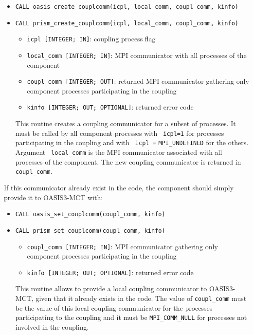 \begin{itemize}
\item {\tt CALL oasis\_create\_couplcomm(icpl, local\_comm,
    coupl\_comm, kinfo)}
\item {\tt CALL prism\_create\_couplcomm(icpl, local\_comm,
    coupl\_comm, kinfo)}
  \begin{itemize}
  \item {\tt icpl [INTEGER; IN]}: coupling process flag
  \item {\tt local\_comm [INTEGER; IN]}: MPI communicator with all
    processes of the component
  \item {\tt coupl\_comm [INTEGER; OUT]}: returned MPI communicator
    gathering only component processes participating in the coupling
  \item {\tt kinfo [INTEGER; OUT; OPTIONAL]}: returned error code
  \end{itemize}

  This routine creates a coupling communicator for a subset of
  processes. It must be called by all component processes with {\tt
    icpl=1} for processes participating in the coupling and with {\tt
    icpl =} {\tt MPI\_UNDEFINED} for the others. Argument {\tt
    local\_comm} is the MPI communicator associated with all processes
  of the component. The new coupling communicator is returned in {\tt
    coupl\_comm}.
\end{itemize}

If this communicator already exist in the code, the component should
simply provide it to OASIS3-MCT with:

\begin{itemize}
\item {\tt CALL oasis\_set\_couplcomm(coupl\_comm, kinfo)}
\item {\tt CALL prism\_set\_couplcomm(coupl\_comm, kinfo)}
  \begin{itemize}
  \item {\tt coupl\_comm [INTEGER; IN]}: MPI communicator gathering
    only component processes participating in the coupling
  \item {\tt kinfo [INTEGER; OUT; OPTIONAL]}: returned error code
  \end{itemize}

  This routine allows to provide a local coupling communicator to
  OASIS3-MCT, given that it already exists in the code. The value of
  {\tt coupl\_comm} must be the value of this local coupling
  communicator for the processes participating to the coupling and it
  must be {\tt MPI\_COMM\_NULL} for processes not involved in the
  coupling.
\end{itemize}


